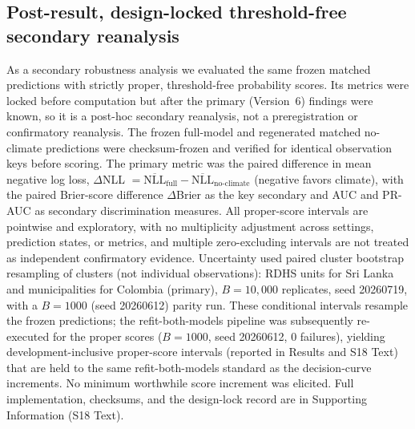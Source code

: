 \documentclass[11pt,a4paper]{article}
\begin{document}
\subsection{Post-result, design-locked threshold-free secondary reanalysis}
As a secondary robustness analysis we evaluated the same frozen matched predictions with strictly proper, threshold-free probability scores. Its metrics were locked before computation but after the primary (Version~6) findings were known, so it is a post-hoc secondary reanalysis, not a preregistration or confirmatory reanalysis. The frozen full-model and regenerated matched no-climate predictions were checksum-frozen and verified for identical observation keys before scoring. The primary metric was the paired difference in mean negative log loss, $\Delta$NLL $=\overline{\mathrm{NLL}}_{\text{full}}-\overline{\mathrm{NLL}}_{\text{no-climate}}$ (negative favors climate), with the paired Brier-score difference $\Delta$Brier as the key secondary and AUC and PR-AUC as secondary discrimination measures. All proper-score intervals are pointwise and exploratory, with no multiplicity adjustment across settings, prediction states, or metrics, and multiple zero-excluding intervals are not treated as independent confirmatory evidence. Uncertainty used paired cluster bootstrap resampling of clusters (not individual observations): RDHS units for Sri Lanka and municipalities for Colombia (primary), $B=10{,}000$ replicates, seed 20260719, with a $B=1000$ (seed 20260612) parity run. These conditional intervals resample the frozen predictions; the refit-both-models pipeline was subsequently re-executed for the proper scores ($B=1000$, seed 20260612, 0 failures), yielding development-inclusive proper-score intervals (reported in Results and S18 Text) that are held to the same refit-both-models standard as the decision-curve increments. No minimum worthwhile score increment was elicited. Full implementation, checksums, and the design-lock record are in Supporting Information (S18 Text).
\end{document}
